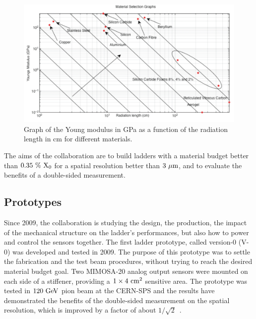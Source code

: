     \begin{figure}[!tbh]
      \centering
      \includegraphics[width = \textwidth]{Pictures/vxd/youngModulus_vs_radiationLength-004.jpg}
      \caption{Graph of the Young modulus in GPa as a function of the radiation length in cm for different materials.}
      \label{fig:YoungModulus}
    \end{figure}

    The aims of the collaboration are to build ladders with a material budget better than $0.35~\%~\rm{X_0}$ for a spatial resolution better than $3~\rm{\mu m}$, and to evaluate the benefits of a double-sided measurement.

    \subsection{Prototypes}
    \label{sec:prototypes}

    Since 2009, the collaboration is studying the design, the production, the impact of the mechanical structure on the ladder's performances, but also how to power and control the sensors together.
    The first ladder prototype, called version-0 (V-0) was developed and tested in 2009.
    The purpose of this prototype was to settle the fabrication and the test beam procedures, without trying to reach the desired material budget goal.
    Two MIMOSA-20 analog output sensors were mounted on each side of a stiffener, providing a $1 \times 4~\rm{cm}^2$ sensitive area.
    The prototype was tested in $120~\rm{GeV}$ pion beam at the CERN-SPS and the results have demonstrated the benefits of the double-sided measurement on the spatial resolution, which is improved by a factor of about $1/\sqrt{2}$~\cite{Nomerotski}.

